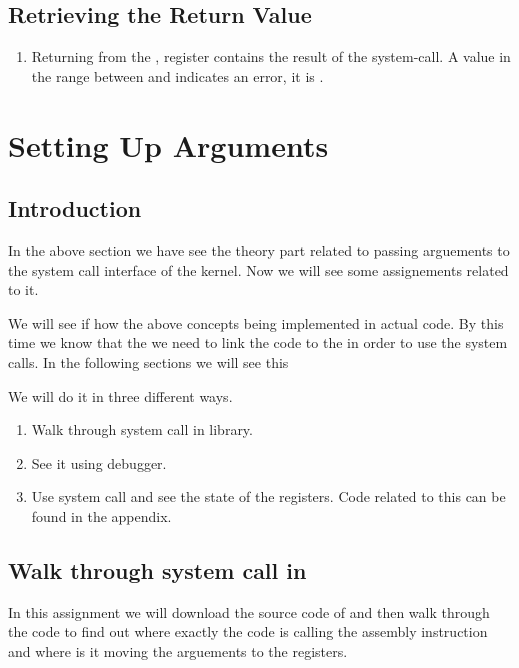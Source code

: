 \documentclass[letterpaper,10pt,english]{sphinxmanual}
\begin{document}
\section{Retrieving the Return Value}
\label{\detokenize{05_calling_system_calls:retrieving-the-return-value}}\begin{enumerate}
\item {} 
Returning from the , register  contains the result of the
system-call. A value in the range between  and  indicates an error, it
is .

\end{enumerate}


\chapter{Setting Up Arguments}
\label{\detokenize{06_setting_up_arguements::doc}}\label{\detokenize{06_setting_up_arguements:setting-up-arguments}}

\section{Introduction}
\label{\detokenize{06_setting_up_arguements:introduction}}
In the above section we have see the theory part related to passing arguements
to the system call interface of the kernel.  Now we will see some assignements
related to it.

We will see if how the above concepts being implemented in actual code. By this
time we know that the we need to link the code to the  in order to use
the system calls. In the following sections we will see this

We will do it in three different ways.
\begin{enumerate}
\item {} 
Walk through  system call in  library.

\item {} 
See it using debugger.

\item {} 
Use  system call and see the state of the registers. Code related to this can be found in the appendix.

\end{enumerate}


\section{Walk through  system call in }
\label{\detokenize{06_setting_up_arguements:walk-through-open-system-call-in-glibc}}
In this assignment we will download the source code of  and then walk through the code
to find out where exactly the code is calling the  assembly instruction and where is
it moving the arguements to the registers.
\end{document}
